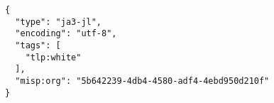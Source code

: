\begin{lstlisting}
{
  "type": "ja3-jl",
  "encoding": "utf-8",
  "tags": [
    "tlp:white"
  ],
  "misp:org": "5b642239-4db4-4580-adf4-4ebd950d210f"
}
\end{lstlisting}
